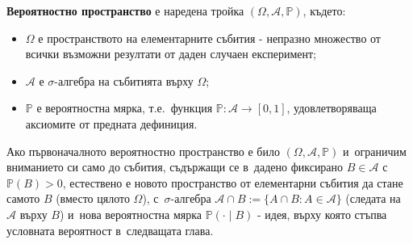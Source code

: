 \begin{defbox}
\textbf{Вероятностно пространство} е наредена тройка
$(\Omega,\mathcal{A},\mathbb{P})$, където:
\begin{itemize}[nosep]
  \item $\Omega$ е пространството на елементарните събития - непразно множество от всички възможни резултати от даден случаен експеримент;
  \item $\mathcal{A}$ е $\sigma$-алгебра на събитията върху $\Omega$;
  \item $\mathbb{P}$ е вероятностна мярка, т.е.\ функция $\mathbb{P}:\mathcal{A}\to[0,1]$, удовлетворяваща аксиомите от предната дефиниция.
\end{itemize}
\end{defbox}

\begin{rembox}[Забележка]
Ако първоначалното вероятностно пространство е било
$(\Omega,\mathcal{A},\mathbb{P})$ и~ограничим вниманието си само до
събития, съдържащи се в~дадено фиксирано $B\in\mathcal A$ с~$\mathbb P(B)>0$, естествено е новото пространство от елементарни
събития да стане самото $B$ (вместо цялото $\Omega$), с~$\sigma$-алгебра
$\mathcal A\cap B := \{A\cap B : A\in\mathcal A\}$ (следата на
$\mathcal A$ върху $B$) и~нова вероятностна мярка $\mathbb P(\cdot
\mid B)$ - идея, върху която стъпва условната вероятност в~следващата глава.
\end{rembox}
